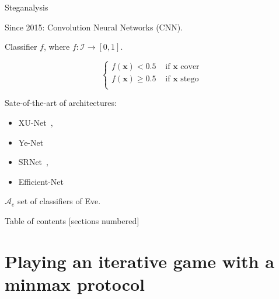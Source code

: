 \documentclass[10pt]{beamer}
\begin{document}
\begin{frame}{Steganalysis}

Since 2015: \alert{Convolution Neural Networks (CNN)}. 

Classifier $f$, where $f : \mathcal{I} \rightarrow [0,1]$.

\begin{equation*}
    \left\{
    \begin{array}{ll}
    f(\mathbf{x}) < 0.5 & \mbox{ if } \mathbf{x}\mbox{ cover} \\
    f(\mathbf{x}) \geq 0.5 & \mbox{ if } \mathbf{x}\mbox{ stego} \\
    \end{array}
    \right.
\end{equation*}

\pause

Sate-of-the-art of architectures:
\begin{itemize}
    \item XU-Net~\cite{xu2017deep},
    \item Ye-Net~
    \item SRNet~\cite{boroumand2018deep},
    \item Efficient-Net~\cite{boroumand2018deep}
\end{itemize}


\pause

$\mathcal{A}_e$ set of classifiers of Eve.

\end{frame}








    


\begin{frame}{Table of contents}
  [sections numbered]
  \tableofcontents[hideallsubsections]
\end{frame}

\section{Playing an iterative game with a \textbf{minmax} protocol}
\end{document}
